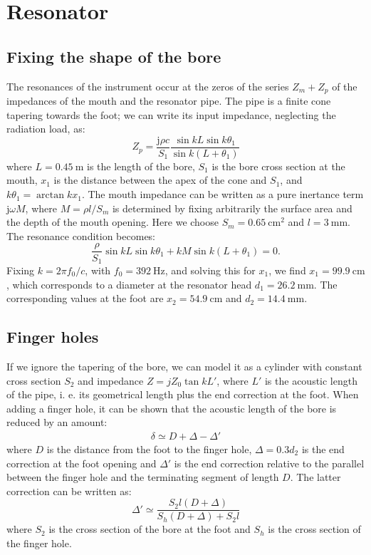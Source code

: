 \documentclass[a4paper]{article}
\begin{document}
\section{Resonator}
\subsection{Fixing the shape of the bore}
The resonances of the instrument occur at the zeros of the series $Z_m + Z_p$ of the impedances of the mouth and the resonator pipe. The pipe is a finite cone tapering towards the foot; we can write its input impedance, neglecting the radiation load, as:
$$ Z_p = \frac{\mathrm{j} \rho c }{S_1} \frac{\sin kL \sin k\theta_1}{\sin k(L+\theta_1)} $$
where $L = 0.45~\si{\meter}$ is the length of the bore, $S_1$ is the bore cross section at the mouth, $x_1$ is the distance between the apex of the cone and $S_1$, and $k\theta_1 = \arctan kx_1 $.
The mouth impedance can be written as a pure inertance term $\mathrm{j} \omega M$, where $M = \rho l / S_m$ is determined by fixing arbitrarily the surface area and the depth of the mouth opening. Here we choose $S_m = 0.65~\si{\centi\meter\squared}$ and $l = 3~\si{\milli\meter}$. 
The resonance condition becomes:
$$ \frac{\rho}{S_1} \sin kL \sin k\theta_1 + kM\sin k(L+\theta_1) = 0 .$$ 
Fixing $k = 2\pi f_0 /c$, with $f_0 = 392~\si{\hertz}$, and solving this for $x_1$, we find $x_1 = 99.9~\si{\centi\meter}$, which corresponds to a diameter at the resonator head $d_1 = 26.2~\si{\milli\meter}$. The corresponding values at the foot are $x_2 = 54.9~\si{\centi\meter}$ and $d_2 = 14.4~\si{\milli\meter}$.

\subsection{Finger holes}
If we ignore the tapering of the bore, we can model it as a cylinder with constant cross section $S_2$ and impedance $Z = jZ_0\tan kL'$, where $L'$ is the acoustic length of the pipe, i. e. its geometrical length plus the end correction at the foot.
When adding a finger hole, it can be shown that the acoustic length of the bore is reduced by an amount:
\begin{align*}
	\delta \simeq D + \Delta - \Delta' 
\end{align*}
where $D$ is the distance from the foot to the finger hole, $\Delta = 0.3d_2$ is the end correction at the foot opening and $\Delta'$ is the end correction relative to the parallel between the finger hole and the terminating segment of length $D$. The latter correction can be written as:
$$ \Delta' \simeq \frac{S_2 l(D+\Delta)}{S_h(D+\Delta) + S_2 l} $$
where $S_2$ is the cross section of the bore at the foot and $S_h$ is the cross section of the finger hole.
\end{document}

